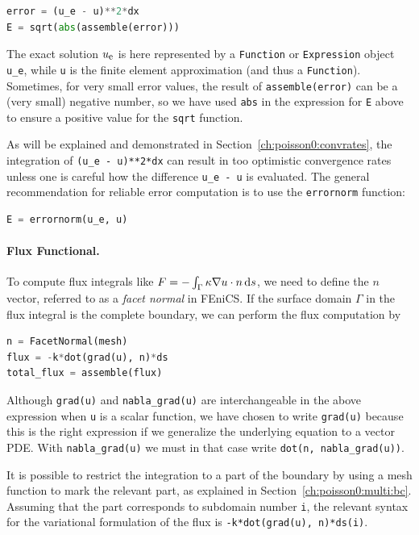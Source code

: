\documentclass[graybox,envcountchap,sectrefs,final]{svmonodo}
\begin{document}
\begin{lstlisting}[language=Python,style=graycolor]
error = (u_e - u)**2*dx
E = sqrt(abs(assemble(error)))
\end{lstlisting}
The exact solution $\uex$ is here represented by a \texttt{Function} or
\texttt{Expression} object \Verb!u_e!, while \texttt{u} is the finite element
approximation (and thus a \texttt{Function}). Sometimes, for very small
error values, the result of \texttt{assemble(error)} can be a (very small)
negative number, so we have used \texttt{abs} in the expression for \texttt{E} above
to ensure a positive value for the \texttt{sqrt} function.


As will be explained and demonstrated in Section~\ref{ch:poisson0:convrates}, the integration of \Verb!(u_e - u)**2*dx!
can result in too optimistic convergence rates unless one is careful
how the difference \Verb!u_e - u! is evaluated. The general recommendation
for reliable error computation is to use the \texttt{errornorm} function:

\begin{lstlisting}[language=Python,style=graycolor]
E = errornorm(u_e, u)
\end{lstlisting}


\paragraph{Flux Functional.}
To compute flux integrals like $F = -\int_\Gamma \kappa\nabla
u\cdot n \ds$, we need to define the $n$ vector,
referred to as a \emph{facet normal} in FEniCS. If the surface domain
$\Gamma$ in the flux integral is the complete boundary, we can perform
the flux computation by

\begin{lstlisting}[language=Python,style=graycolor]
n = FacetNormal(mesh)
flux = -k*dot(grad(u), n)*ds
total_flux = assemble(flux)
\end{lstlisting}
Although \texttt{grad(u)} and \Verb!nabla_grad(u)! are interchangeable in the above
expression when \texttt{u} is a scalar function, we have chosen to write
\texttt{grad(u)} because this is the right expression if we generalize the
underlying equation to a vector PDE. With \Verb!nabla_grad(u)! we
must in that case write \Verb!dot(n, nabla_grad(u))!.

It is possible to restrict the integration to a part of the boundary
by using a mesh function to mark the relevant part, as explained in
Section~\ref{ch:poisson0:multi:bc}. Assuming that the part corresponds
to subdomain number \texttt{i}, the relevant syntax for the variational
formulation of the flux is \texttt{-k*dot(grad(u), n)*ds(i)}.
\end{document}
